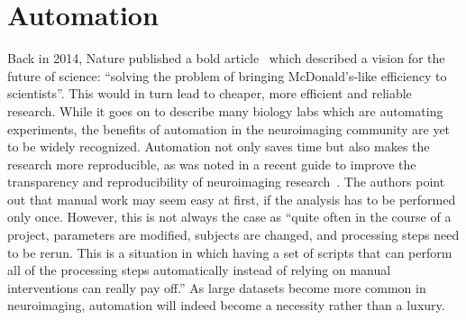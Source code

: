 \section{Automation}

Back in 2014, Nature published a bold article~\citep{hayden2014automated} which described a vision for the future of science: ``solving the problem of bringing McDonald's-like efficiency to scientists''. This would in turn lead to cheaper, more efficient and reliable research. While it goes on to describe many biology labs which are automating experiments, the benefits of automation in the neuroimaging community are yet to be widely recognized. Automation not only saves time but also makes the research more reproducible, as was noted in a recent guide to improve the transparency and reproducibility of neuroimaging research~\citep{gorgolewski2016practical}. The authors point out that manual work may seem easy at first, if the analysis has to be performed only once. However, this is not always the case as ``quite often in the course of a project, parameters are modified, subjects are changed, and processing steps need to be rerun. This is a situation in which having a set of scripts that can perform all of the processing steps automatically instead of relying on manual interventions can really pay off.'' As large datasets become more common in neuroimaging, automation will indeed become a necessity rather than a luxury.

